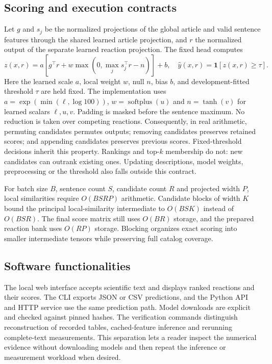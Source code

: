 \documentclass[preprint,12pt,a4paper]{elsarticle}
\begin{document}
\subsection{Scoring and execution contracts}
Let $g$ and $s_j$ be the normalized projections of the global article and
valid sentence features through the shared learned article projection, and $r$
the normalized output of the separate learned reaction projection. The fixed head computes
\begin{equation}
 z(x,r)=a\left[g^\top r+w\max\left(0,\max_j s_j^\top r-n\right)\right]+b,
 \quad \widehat{y}(x,r)=\mathbf{1}[z(x,r)\geq\tau].
\end{equation}
Here the learned scale $a$, local weight $w$, null $n$, bias $b$, and development-fitted
threshold $\tau$ are held fixed. The implementation uses
$a=\exp(\min(\ell,\log 100))$, $w=\operatorname{softplus}(u)$ and
$n=\tanh(v)$ for learned scalars $\ell,u,v$. Padding is masked before the
sentence maximum. No reduction is taken over competing reactions.
Consequently, in real arithmetic, permuting candidates permutes outputs; removing
candidates preserves retained scores; and appending candidates preserves previous
scores. Fixed-threshold decisions inherit this property. Rankings and top-$k$
membership do not: new candidates can outrank existing ones. Updating descriptions,
model weights, preprocessing or the threshold also falls outside this contract.

For batch size $B$, sentence count $S$, candidate count $R$ and projected width
$P$, local similarities require $O(BSRP)$ arithmetic. Candidate blocks of width
$K$ bound the principal local-similarity intermediate to $O(BSK)$ instead of
$O(BSR)$. The final score matrix still uses $O(BR)$ storage, and the prepared
reaction bank uses $O(RP)$ storage. Blocking organizes exact scoring into smaller intermediate tensors while
preserving full catalog coverage.
\subsection{Software functionalities}
The local web interface accepts scientific text and displays ranked reactions and
their scores. The CLI exports JSON or CSV predictions, and the Python API and HTTP
service use the same prediction path. Model downloads are explicit and checked
against pinned hashes. The verification commands distinguish reconstruction of
recorded tables, cached-feature inference and rerunning complete-text measurements.
This separation lets a reader inspect the numerical evidence without downloading
models and then repeat the inference or measurement workload when desired.
\end{document}
